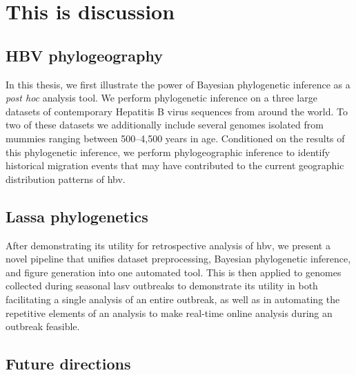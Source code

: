 \chapter{This is discussion}\label{ch:discussion}

\section{HBV phylogeography}

In this thesis, we first illustrate the power of Bayesian phylogenetic inference as a \textit{post hoc} analysis tool.
We perform phylogenetic inference on a three large datasets of contemporary Hepatitis B virus sequences from around the world.
To two of these datasets we additionally include several genomes isolated from mummies ranging between 500--4,500 years in age.
Conditioned on the results of this phylogenetic inference, we perform phylogeographic inference to identify historical migration events that may have contributed to the current geographic distribution patterns of \gls{hbv}.

\section{Lassa phylogenetics}

After demonstrating its utility for retrospective analysis of \gls{hbv}, we present a novel pipeline that unifies dataset preprocessing, Bayesian phylogenetic inference, and figure generation into one automated tool.
This is then applied to genomes collected during seasonal \gls{lasv} outbreaks to demonstrate its utility in both facilitating a single analysis of an entire outbreak, as well as in automating the repetitive elements of an analysis to make real-time online analysis during an outbreak feasible.

\section{Future directions}

